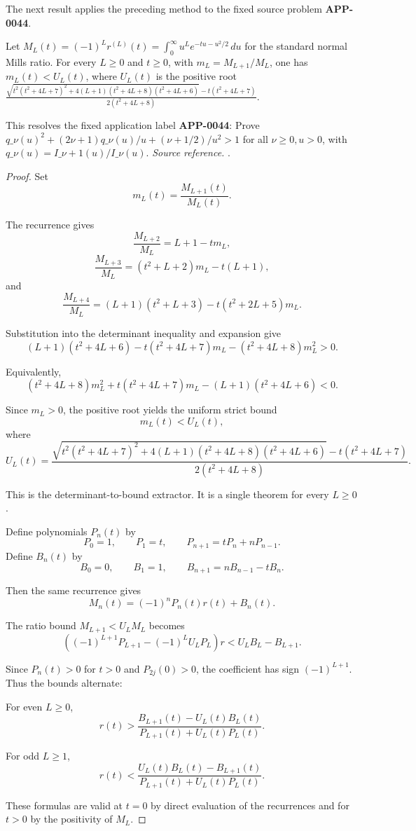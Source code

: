 The next result applies the preceding method to the fixed source problem \textbf{APP-0044}.
\begin{theorem}
\label{res:from-mills-all-l-moment-ratio-quadratic-bound}
Let \(M_L(t)=(-1)^L r^{(L)}(t)=\int_0^\infty u^L e^{-tu-u^2/2}\,du\) for the standard normal Mills ratio. For every \(L\ge0\) and \(t\ge0\), with \(m_L=M_{L+1}/M_L\), one has \(m_L(t)<U_L(t)\), where \(U_L(t)\) is the positive root \(\frac{\sqrt{t^2(t^2+4L+7)^2+4(L+1)(t^2+4L+8)(t^2+4L+6)}-t(t^2+4L+7)}{2(t^2+4L+8)}\).

This resolves the fixed application label \textbf{APP-0044}: Prove \(q\_\nu(u)^2+(2\nu+1)q\_\nu(u)/u+(\nu+1/2)/u^2>1\) for all \(\nu\ge0,u>0\), with \(q\_\nu(u)=I\_{\nu+1}(u)/I\_\nu(u)\).
\emph{Source reference.} \cite{app-app-0044-source}.
\end{theorem}
\begin{proof}
Set
\[
m_L(t)=\frac{M_{L+1}(t)}{M_L(t)}.
\]

The recurrence gives
\[
\frac{M_{L+2}}{M_L}=L+1-tm_L,
\]
\[
\frac{M_{L+3}}{M_L}=(t^2+L+2)m_L-t(L+1),
\]
and
\[
\frac{M_{L+4}}{M_L}=(L+1)(t^2+L+3)-t(t^2+2L+5)m_L.
\]

Substitution into the determinant inequality and expansion give
\[
(L+1)(t^2+4L+6)-t(t^2+4L+7)m_L-(t^2+4L+8)m_L^2>0.
\]

Equivalently,
\[
(t^2+4L+8)m_L^2+t(t^2+4L+7)m_L-(L+1)(t^2+4L+6)<0.
\]

Since \(m_L>0\), the positive root yields the uniform strict bound
\[
m_L(t)<U_L(t),
\]
where
\[
U_L(t)=
\frac{
\sqrt{t^2(t^2+4L+7)^2+4(L+1)(t^2+4L+8)(t^2+4L+6)}
-t(t^2+4L+7)
}
{2(t^2+4L+8)}.
\]

This is the determinant-to-bound extractor. It is a single theorem for every \(L\ge0\).

Define polynomials \(P_n(t)\) by
\[
P_0=1,\qquad P_1=t,\qquad P_{n+1}=tP_n+nP_{n-1}.
\]
Define \(B_n(t)\) by
\[
B_0=0,\qquad B_1=1,\qquad B_{n+1}=nB_{n-1}-tB_n.
\]

Then the same recurrence gives
\[
M_n(t)=(-1)^nP_n(t)r(t)+B_n(t).
\]

The ratio bound \(M_{L+1}<U_LM_L\) becomes
\[
\left((-1)^{L+1}P_{L+1}-(-1)^L U_LP_L\right)r
<U_LB_L-B_{L+1}.
\]

Since \(P_n(t)>0\) for \(t>0\) and \(P_{2j}(0)>0\), the coefficient has sign \((-1)^{L+1}\). Thus the bounds alternate:

For even \(L\ge0\),
\[
r(t)>
\frac{B_{L+1}(t)-U_L(t)B_L(t)}
{P_{L+1}(t)+U_L(t)P_L(t)}.
\]

For odd \(L\ge1\),
\[
r(t)<
\frac{U_L(t)B_L(t)-B_{L+1}(t)}
{P_{L+1}(t)+U_L(t)P_L(t)}.
\]

These formulas are valid at \(t=0\) by direct evaluation of the recurrences and for \(t>0\) by the positivity of \(M_L\).
\end{proof}

